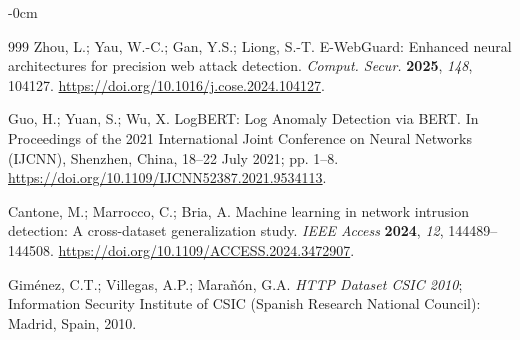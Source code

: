 \documentclass[futureinternet,article,submit,moreauthors]{Definitions/mdpi}
\begin{document}
\begin{adjustwidth}{-\extralength}{0cm}
\begin{thebibliography}{999}
Zhou, L.; Yau, W.-C.; Gan, Y.S.; Liong, S.-T. E-WebGuard: Enhanced neural architectures for precision web attack detection. \emph{Comput. Secur.} \textbf{2025}, \emph{148}, 104127. \url{https://doi.org/10.1016/j.cose.2024.104127}.

Guo, H.; Yuan, S.; Wu, X. LogBERT: Log Anomaly Detection via BERT. In Proceedings of the 2021 International Joint Conference on Neural Networks (IJCNN), Shenzhen, China, 18--22 July 2021; pp. 1--8. \url{https://doi.org/10.1109/IJCNN52387.2021.9534113}.

Cantone, M.; Marrocco, C.; Bria, A. Machine learning in network intrusion detection: A cross-dataset generalization study. \emph{IEEE Access} \textbf{2024}, \emph{12}, 144489--144508. \url{https://doi.org/10.1109/ACCESS.2024.3472907}.

Gim\'{e}nez, C.T.; Villegas, A.P.; Mara\~{n}\'{o}n, G.A. \emph{HTTP Dataset CSIC 2010}; Information Security Institute of CSIC (Spanish Research National Council): Madrid, Spain, 2010.

\end{thebibliography}
\end{adjustwidth}
\end{document}

